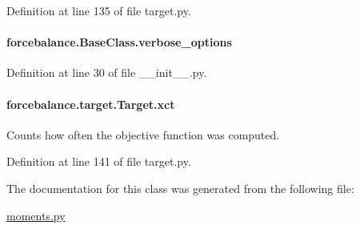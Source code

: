 Definition at line 135 of file target.\-py.

\hypertarget{classforcebalance_1_1BaseClass_afd68efa29ccd2f320f4cf82198214aac}{
\paragraph[{verbose\-\_\-options}]{\setlength{\rightskip}{0pt plus 5cm}forcebalance.\-Base\-Class.\-verbose\-\_\-options\hspace{0.3cm}{\ttfamily [inherited]}}}\label{classforcebalance_1_1BaseClass_afd68efa29ccd2f320f4cf82198214aac}


Definition at line 30 of file \-\_\-\-\_\-init\-\_\-\-\_\-.\-py.

\hypertarget{classforcebalance_1_1target_1_1Target_aad2e385cfbf7b4a68f1c2cb41133fe82}{
\paragraph[{xct}]{\setlength{\rightskip}{0pt plus 5cm}forcebalance.\-target.\-Target.\-xct\hspace{0.3cm}{\ttfamily [inherited]}}}\label{classforcebalance_1_1target_1_1Target_aad2e385cfbf7b4a68f1c2cb41133fe82}


Counts how often the objective function was computed. 



Definition at line 141 of file target.\-py.



The documentation for this class was generated from the following file\-:\begin{DoxyCompactItemize}
\item 
\hyperlink{moments_8py}{moments.\-py}\end{DoxyCompactItemize}
